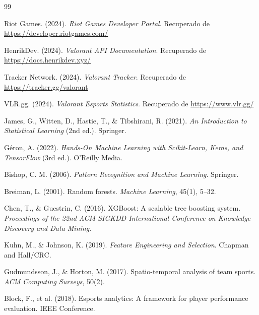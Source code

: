 \documentclass{ULBreport} %
\begin{document}
\newpage
\begingroup
\sloppy
\begin{thebibliography}{99}

    Riot Games. (2024). 
    \textit{Riot Games Developer Portal}. Recuperado de \url{https://developer.riotgames.com/}
    
    HenrikDev. (2024). 
    \textit{Valorant API Documentation}. Recuperado de \url{https://docs.henrikdev.xyz/}
    
    Tracker Network. (2024). 
    \textit{Valorant Tracker}. Recuperado de \url{https://tracker.gg/valorant}
    
    VLR.gg. (2024). 
    \textit{Valorant Esports Statistics}. Recuperado de \url{https://www.vlr.gg/}
    
    James, G., Witten, D., Hastie, T., \& Tibshirani, R. (2021). 
    \textit{An Introduction to Statistical Learning} (2nd ed.). Springer.
    
    Géron, A. (2022). 
    \textit{Hands-On Machine Learning with Scikit-Learn, Keras, and TensorFlow} (3rd ed.). O'Reilly Media.
    
    Bishop, C. M. (2006). 
    \textit{Pattern Recognition and Machine Learning}. Springer.
    
    Breiman, L. (2001). Random forests.  
    \textit{Machine Learning}, 45(1), 5–32.
    
    Chen, T., \& Guestrin, C. (2016). XGBoost: A scalable tree boosting system. 
    \textit{Proceedings of the 22nd ACM SIGKDD International Conference on Knowledge Discovery and Data Mining}.
    
    Kuhn, M., \& Johnson, K. (2019). 
    \textit{Feature Engineering and Selection}. Chapman and Hall/CRC.
    
    Gudmundsson, J., \& Horton, M. (2017). Spatio-temporal analysis of team sports. 
    \textit{ACM Computing Surveys}, 50(2).
    
    Block, F., et al. (2018). Esports analytics: A framework for player performance evaluation. IEEE Conference.

\end{thebibliography}
\endgroup
\end{document}

